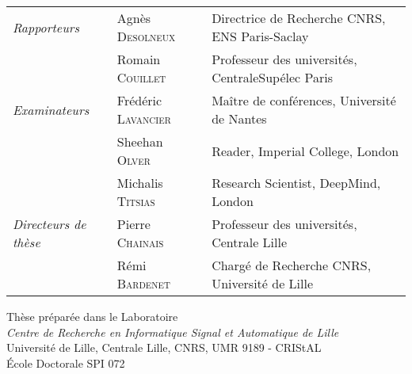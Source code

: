 {{{        \vspace{2em}

        {\begin{minipage}[b]{0.55\linewidth}
          \hspace{-2.5em}
        \end{minipage}
        \hfill
        \begin{minipage}[b]{0.49\linewidth}

        \end{minipage}}

        \vspace{0.5em}

        {\hspace{-3em}
        \begin{tabular}{lll}
        \textit{Rapporteurs}
            &   Agnès {\scshape Desolneux }
            &   Directrice de Recherche CNRS, ENS Paris-Saclay
            \\
            &   Romain {\scshape Couillet}
            &   Professeur des universités, CentraleSupélec Paris\\
        \textit{Examinateurs}
            &   Frédéric {\scshape Lavancier}
            &   Maître de conférences, Université de Nantes
            \\
            &   Sheehan {\scshape Olver}
            &   Reader, Imperial College, London
            \\
            &   Michalis {\scshape Titsias}
            &   Research Scientist, DeepMind, London
            \\
        \textit{Directeurs de thèse}
            &   Pierre {\scshape Chainais}
            &   Professeur des universités, Centrale Lille
            \\
            &   Rémi {\scshape Bardenet}
            &   Chargé de Recherche CNRS, Université de Lille
        \end{tabular}
        }

        \vspace{2em}

        \begin{center}
            {\large Thèse préparée dans le Laboratoire} \\
            {\large \textit{Centre de Recherche en Informatique Signal et Automatique de Lille}\\ Université de Lille, Centrale Lille, CNRS, UMR 9189 - CRIStAL \\
            École Doctorale SPI 072}
        \end{center}

}}}

